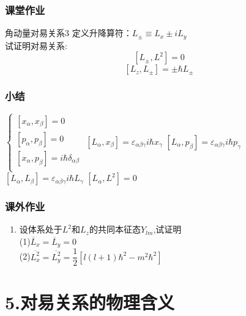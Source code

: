 \begin{frame} 
    \frametitle{课堂作业}
    \begin{tcolorbox2}{角动量对易关系3}
     定义升降算符：$L_\pm \equiv L_x \pm i L_y$ \\
     试证明对易关系:  $$[L_\pm,L^2]=0$$
     $$[L_z, L_\pm]= \pm \hbar L_\pm $$
    \end{tcolorbox2}
\end{frame} 


\begin{frame} 
    \frametitle{小结}
    \begin{tcolorbox4}[常见对易关系]
        \begin{enumerate}
            \Item $\begin{cases}
                [x_\alpha,x_\beta]= 0  \\ 
                [p_\alpha,p_\beta]= 0  \\ 
                [x_\alpha,p_\beta]= i\hbar \delta_{\alpha\beta}  \\ 
                \end{cases}$
            \Item $ [L_\alpha,x_\beta]= \varepsilon_{\alpha\beta\gamma} i\hbar x_\gamma $
            \Item $ [L_\alpha,p_\beta]= \varepsilon_{\alpha\beta\gamma} i\hbar p_\gamma $
            \Item $ [L_\alpha,L_\beta]= \varepsilon_{\alpha\beta\gamma} i\hbar L_\gamma $
            \Item $ [L_\alpha,L^2]= 0 $
        \end{enumerate}
    \end{tcolorbox4}
\end{frame} 

\begin{frame}
    \frametitle{课外作业}
    \begin{enumerate}
        \item 设体系处于$L^2$和$L_z$的共同本征态$Y_{lm}$,试证明\\
              (1)$\overline{L}_x=\overline{L}_y=0$ \\
              (2)$\overline{L_x^2}=\overline{L_y^2}=\dfrac{1}{2}[l(l+1)\hbar^2-m^2\hbar^2]$ \\
    \end{enumerate}
\end{frame}


\section{5.对易关系的物理含义}

